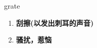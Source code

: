 
\begin{frame}
{\huge grate}
\begin{center}
\begin{enumerate}\Large
  \item \textbf{刮擦(以发出刺耳的声音)}
  \item \textbf{骚扰，惹恼}
\end{enumerate}
\end{center}
\end{frame}
